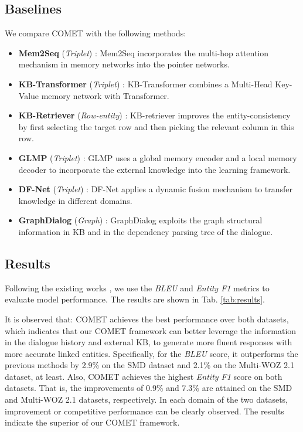 \documentclass[11pt]{article}
\begin{document}
\subsection{Baselines}
We compare COMET with the following methods: 
\begin{itemize}
    \item \textbf{Mem2Seq} (\textit{Triplet}) \cite{madotto-etal-2018-mem2seq}: Mem2Seq incorporates the multi-hop attention mechanism in memory networks into the pointer networks.
    \item \textbf{KB-Transformer} (\textit{Triplet}) \cite{h-2019-kbtransformer}: KB-Transformer combines a Multi-Head Key-Value memory network with Transformer.
    \item \textbf{KB-Retriever} (\textit{Row-entity}) \cite{qin-etal-2019-entity}: KB-retriever improves the entity-consistency by first selecting the target row and then picking the relevant column in this row.
    \item \textbf{GLMP} (\textit{Triplet}) \cite{wu2018globaltolocal}: GLMP uses a global memory encoder and a local memory decoder to incorporate the external knowledge into the learning framework.
    \item \textbf{DF-Net} (\textit{Triplet}) \cite{qin-etal-2020-dynamic}: DF-Net applies a dynamic fusion mechanism to transfer knowledge in different domains.
    \item \textbf{GraphDialog} (\textit{Graph}) \cite{yang-etal-2020-graphdialog}: GraphDialog exploits  the  graph  structural information in KB and in the dependency parsing tree of the dialogue.
\end{itemize}


\subsection{Results}
Following the existing works \cite{qin-etal-2020-dynamic, yang-etal-2020-graphdialog}, we use the \textit{BLEU} and \textit{Entity F1}
metrics to evaluate model performance. The results are shown in Tab. \ref{tab:results}. 


It is observed that: COMET achieves the best performance over both datasets, which indicates that our COMET framework can better leverage the information in the dialogue history and external KB, to generate more fluent responses with more accurate linked entities. Specifically, for the \textit{BLEU} score, it outperforms the previous methods by 2.9\% on the SMD dataset and 2.1\% on the Multi-WOZ 2.1 dataset, at least. Also, COMET achieves the highest \textit{Entity F1} score on both datasets. That is, the improvements of 0.9\% and 7.3\% are attained on the SMD and Multi-WOZ 2.1 datasets, respectively. In each domain of the two datasets, improvement or competitive performance can be clearly observed. The results indicate the superior of our COMET framework.
\end{document}
